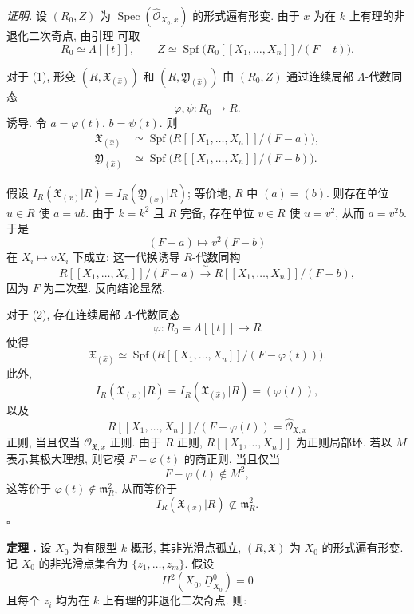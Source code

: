 \smallskip
\noindent\textit{证明.}
设 $(R_0,Z)$ 为 $\operatorname{Spec}(\widehat{\mathcal O}_{X_0,x})$ 的形式遍有形变. 由于 $x$ 为在 $k$ 上有理的非退化二次奇点, 由引理  可取
\[
R_0\simeq\Lambda[[t]],
\qquad
Z\simeq\operatorname{Spf}
 \bigl(R_0[[X_1,\ldots,X_n]]/(F-t)\bigr).
\]

对于 (1), 形变 $(R,\mathfrak X_{(\widehat x)})$ 和 $(R,\mathfrak Y_{(\widehat x)})$ 由 $(R_0,Z)$ 通过连续局部 $\Lambda$-代数同态
\[
\varphi,\psi:R_0\longrightarrow R.
\]
诱导. 令 $a=\varphi(t)$, $b=\psi(t)$. 则
\[
\begin{aligned}
\mathfrak X_{(\widehat x)}
&\simeq\operatorname{Spf}
 \bigl(R[[X_1,\ldots,X_n]]/(F-a)\bigr),\\
\mathfrak Y_{(\widehat x)}
&\simeq\operatorname{Spf}
 \bigl(R[[X_1,\ldots,X_n]]/(F-b)\bigr).
\end{aligned}
\]


假设 $I_R(\mathfrak X_{(x)}|R)=I_R(\mathfrak Y_{(x)}|R)$; 等价地, $R$ 中 $(a)=(b)$. 则存在单位 $u\in R$ 使 $a=ub$. 由于 $k=k^2$ 且 $R$ 完备, 存在单位 $v\in R$ 使 $u=v^2$, 从而 $a=v^2b$. 于是
\[
(F-a)\longmapsto v^2(F-b)
\]
在 $X_i\mapsto vX_i$ 下成立; 这一代换诱导 $R$-代数同构
\[
R[[X_1,\ldots,X_n]]/(F-a)
 \xrightarrow{\ \sim\ }
R[[X_1,\ldots,X_n]]/(F-b),
\]
因为 $F$ 为二次型. 反向结论显然.

对于 (2), 存在连续局部 $\Lambda$-代数同态
\[
\varphi:R_0=\Lambda[[t]]\longrightarrow R
\]
使得
\[
\mathfrak X_{(\widehat x)}
\simeq\operatorname{Spf}
 \bigl(R[[X_1,\ldots,X_n]]/(F-\varphi(t))\bigr).
\]
此外,
\[
I_R(\mathfrak X_{(x)}|R)
=I_R(\mathfrak X_{(\widehat x)}|R)
=(\varphi(t)),
\]
以及
\[
R[[X_1,\ldots,X_n]]/(F-\varphi(t))
=\widehat{\mathcal O}_{\mathfrak X,x}
\]
正则, 当且仅当 $\mathcal O_{\mathfrak X,x}$ 正则. 由于 $R$ 正则, $R[[X_1,\ldots,X_n]]$ 为正则局部环. 若以 $M$ 表示其极大理想, 则它模 $F-\varphi(t)$ 的商正则, 当且仅当
\[
F-\varphi(t)\notin M^2,
\]
这等价于 $\varphi(t)\notin\mathfrak m_R^2$, 从而等价于
\[
I_R(\mathfrak X_{(x)}|R)\not\subset\mathfrak m_R^2.
\]
\hfill$\square$


\par\medskip
\noindent\textbf{定理 .}
设 $X_0$ 为有限型 $k$-概形, 其非光滑点孤立, $(R,\mathfrak X)$ 为 $X_0$ 的形式遍有形变. 记 $X_0$ 的非光滑点集合为 $\{z_1,\ldots,z_m\}$. 假设
\[
H^2(X_0,\underline D^0_{X_0})=0
\]
且每个 $z_i$ 均为在 $k$ 上有理的非退化二次奇点. 则:

